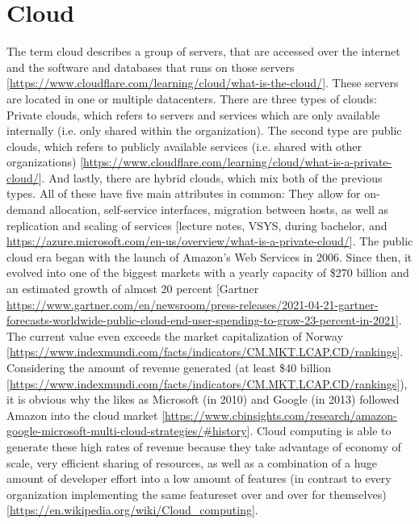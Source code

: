 \section{Cloud}
The term cloud describes a group of servers, that are accessed over the internet and the software and databases that runs on those servers [\url{https://www.cloudflare.com/learning/cloud/what-is-the-cloud/}]. These servers are located in one or multiple datacenters. There are three types of clouds: Private clouds, which refers to servers and services which are only available internally (i.e. only shared within the organization). The second type are public clouds, which refers to publicly available services (i.e. shared with other organizations) [\url{https://www.cloudflare.com/learning/cloud/what-is-a-private-cloud/}]. And lastly, there are hybrid clouds, which mix both of the previous types. All of these have five main attributes in common: They allow for on-demand allocation, self-service interfaces, migration between hosts, as well as replication and scaling of services [lecture notes, VSYS, during bachelor, and \url{https://azure.microsoft.com/en-us/overview/what-is-a-private-cloud/}].
\newline
The public cloud era began with the launch of Amazon's Web Services in 2006. Since then, it evolved into one of the biggest markets with a yearly capacity of \$270 billion and an estimated growth of almost 20 percent [Gartner \url{https://www.gartner.com/en/newsroom/press-releases/2021-04-21-gartner-forecasts-worldwide-public-cloud-end-user-spending-to-grow-23-percent-in-2021}]. The current value even exceeds the market capitalization of Norway [\url{https://www.indexmundi.com/facts/indicators/CM.MKT.LCAP.CD/rankings}]. Considering the amount of revenue generated (at least \$40 billion [\url{https://www.indexmundi.com/facts/indicators/CM.MKT.LCAP.CD/rankings}]), it is obvious why the likes as Microsoft (in 2010) and Google (in 2013) followed Amazon into the cloud market [\url{https://www.cbinsights.com/research/amazon-google-microsoft-multi-cloud-strategies/#history}].
\newline
Cloud computing is able to generate these high rates of revenue because they take advantage of economy of scale, very efficient sharing of resources, as well as a combination of a huge amount of developer effort into a low amount of features (in contrast to every organization implementing the same featureset over and over for themselves) [\url{https://en.wikipedia.org/wiki/Cloud_computing}].
\newline
